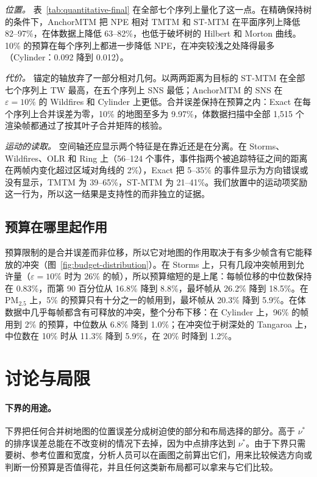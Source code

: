 \documentclass[preprint]{vgtc_zh}   %
\begin{document}
\emph{位置。} 表~\ref{tab:quantitative-final} 在全部七个序列上量化了这一点。在精确保持树的条件下，AnchorMTM 把 NPE 相对 TMTM 和 ST-MTM 在平面序列上降低 82--97\%，在体数据上降低 63--82\%，也低于破坏树的 Hilbert 和 Morton 曲线。10\% 的预算在每个序列上都进一步降低 NPE，在冲突较浅之处降得最多（Cylinder：0.092 降到 0.012）。

\emph{代价。} 锚定的轴放弃了一部分相对几何。以两两距离为目标的 ST-MTM 在全部七个序列上 TW 最高，在五个序列上 SNS 最低；AnchorMTM 的 SNS 在 $\varepsilon=10\%$ 的 Wildfires 和 Cylinder 上更低。合并误差保持在预算之内：Exact 在每个序列上合并误差为零，10\% 的地图至多为 9.97\%，体数据扫描中全部 1,515 个渲染帧都通过了按其叶子合并矩阵的核验。

\emph{运动的读取。} 空间轴还应显示两个特征是在靠近还是在分离。在 Storms、Wildfires、OLR 和 Ring 上（56--124 个事件，事件指两个被追踪特征之间的距离在两帧内变化超过区域对角线的 2\%），Exact 把 5--35\% 的事件显示为方向错误或没有显示，TMTM 为 39--65\%，ST-MTM 为 21--41\%。我们放置中的运动项奖励这一行为，所以这一结果是支持性的而非独立的证据。

\subsection{预算在哪里起作用}\label{sec:eval-budget}
预算限制的是合并误差而非位移，所以它对地图的作用取决于有多少帧含有它能释放的冲突（图~\ref{fig:budget-distribution}）。在 Storms 上，只有几段冲突帧用到允许量（$\varepsilon=10\%$ 时为 26\% 的帧），所以预算缩短的是上尾：每帧位移的中位数保持在 0.83\%，而第 90 百分位从 16.8\% 降到 8.8\%，最坏帧从 26.2\% 降到 18.5\%。在 PM$_{2.5}$ 上，5\% 的预算只有十分之一的帧用到，最坏帧从 20.3\% 降到 5.9\%。在体数据中几乎每帧都含有可释放的冲突，整个分布下移：在 Cylinder 上，96\% 的帧用到 2\% 的预算，中位数从 6.8\% 降到 1.0\%；在冲突位于树深处的 Tangaroa 上，中位数在 10\% 时从 11.3\% 降到 5.9\%，在 20\% 时降到 1.2\%。

\section{讨论与局限}
\paragraph{下界的用途。} 下界把任何合并树地图的位置误差分成树迫使的部分和布局选择的部分。高于 $\nu^*$ 的排序误差总能在不改变树的情况下去掉，因为中点排序达到 $\nu^*$。由于下界只需要树、参考位置和宽度，分析人员可以在画图之前算出它们，用来比较候选方向或判断一份预算是否值得花，并且任何这类新布局都可以拿来与它们比较。
\end{document}
